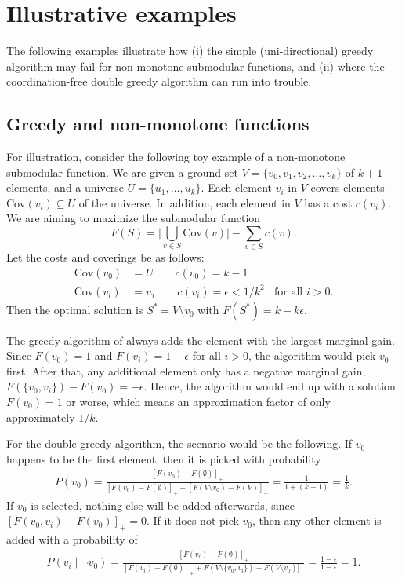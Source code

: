 \section{Illustrative examples}

The following examples illustrate how (i) the simple (uni-directional) greedy algorithm may fail for non-monotone submodular functions, and (ii) where the coordination-free double greedy algorithm can run into trouble.

\subsection{Greedy and non-monotone functions}\label{app:greedyfail}

For illustration, consider the following toy example of a non-monotone submodular function. We are given a ground set $V = \{v_0, v_1, v_2, \ldots, v_k\}$ of $k+1$ elements, and a universe $U = \{u_1, \ldots, u_k\}$. Each element $v_i$ in $V$ covers elements $\mathrm{Cov}(v_i) \subseteq U$ of the universe. In addition, each element in $V$ has a cost $c(v_i)$. We are aiming to maximize the submodular function
\begin{equation}
  \label{eq:1}
  F(S) = \Big|\bigcup_{v \in S}\mathrm{Cov}(v)\Big| - \sum_{v \in S}c(v).
\end{equation}
Let the costs and coverings be as follows:
\begin{align}
  \mathrm{Cov}(v_0) &= U \qquad c(v_0) = k-1\\
  \mathrm{Cov}(v_i) &= u_i  \qquad c(v_i) = \epsilon < 1/k^2\;\; \text{ for all } i > 0.
\end{align}
Then the optimal solution is $S^* = V\setminus v_0$ with $F(S^*) = k - k\epsilon$. 

The greedy algorithm of \citet{nemhauser1978} always adds the element with the largest marginal gain. Since $F(v_0) = 1$ and $F(v_i) = 1-\epsilon$ for all $i > 0$, the algorithm would pick $v_0$ first. After that, any additional element only has a negative marginal gain, $F(\{v_0,v_i\}) - F(v_0) = - \epsilon$. Hence, the algorithm would end up with a solution $F(v_0) = 1$ or worse, which means an approximation factor of only approximately $1/k$.

For the double greedy algorithm, the scenario would be the following.
If $v_0$ happens to be the first element, then it is picked with probability
\begin{align}
  P(v_0) =
  \frac{[F(v_0) - F(\emptyset)]_+}{[F(v_0) - F(\emptyset)]_+ +
    [F(V\setminus v_0) - F(V)]_-} = \frac{1}{1 + (k-1)} = \frac{1}{k}.
\end{align}
If $v_0$ is selected, nothing else will be added afterwards, since $[F(v_0,v_i) - F(v_0)]_+ = 0$. If it does not pick $v_0$, then any other element is added with a probability of 
\begin{align}
  P(v_i \mid \neg v_0) = \frac{[F(v_i) - F(\emptyset)]_+}{[F(v_i) - F(\emptyset)]_+ + F(V\setminus \{v_0,v_i\}) - F(V\setminus v_0)]_-} = \frac{1-\epsilon}{1-\epsilon} = 1.
\end{align}

